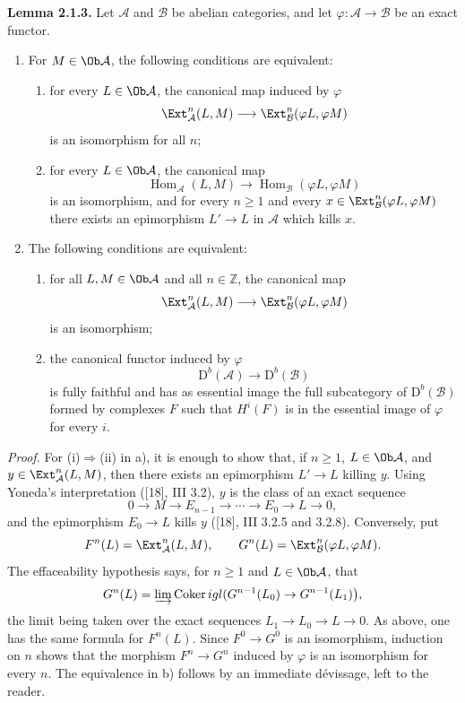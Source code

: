 \textbf{Lemma 2.1.3.} Let $\mathcal A$ and $\mathcal B$ be abelian categories, and let $\varphi:\mathcal A\to\mathcal B$ be an exact functor.
\begin{enumerate}[label=\alph*)]
\item For $M\in\Ob\mathcal A$, the following conditions are equivalent:
\begin{enumerate}[label=(\roman*)]
\item for every $L\in\Ob\mathcal A$, the canonical map induced by $\varphi$
\[
\Ext^n_{\mathcal A}(L,M)\longrightarrow\Ext^n_{\mathcal B}(\varphi L,\varphi M)
\]
is an isomorphism for all $n$;
\item for every $L\in\Ob\mathcal A$, the canonical map
\[
\operatorname{Hom}_{\mathcal A}(L,M)\longrightarrow\operatorname{Hom}_{\mathcal B}(\varphi L,\varphi M)
\]
is an isomorphism, and for every $n\ge1$ and every $x\in\Ext^n_{\mathcal B}(\varphi L,\varphi M)$ there exists an epimorphism $L'\to L$ in $\mathcal A$ which kills $x$.
\end{enumerate}
\item The following conditions are equivalent:
\begin{enumerate}[label=(\roman*)]
\item for all $L,M\in\Ob\mathcal A$ and all $n\in\mathbb Z$, the canonical map
\[
\Ext^n_{\mathcal A}(L,M)\longrightarrow\Ext^n_{\mathcal B}(\varphi L,\varphi M)
\]
is an isomorphism;
\item the canonical functor induced by $\varphi$
\[
\mathrm D^b(\mathcal A)\longrightarrow\mathrm D^b(\mathcal B)
\]
is fully faithful and has as essential image the full subcategory of $\mathrm D^b(\mathcal B)$ formed by complexes $F$ such that $H^i(F)$ is in the essential image of $\varphi$ for every $i$.
\end{enumerate}
\end{enumerate}

\emph{Proof.} For (i)$\Rightarrow$(ii) in a), it is enough to show that, if $n\ge1$, $L\in\Ob\mathcal A$, and $y\in\Ext^n_{\mathcal A}(L,M)$, then there exists an epimorphism $L'\to L$ killing $y$. Using Yoneda's interpretation ([18], III 3.2), $y$ is the class of an exact sequence
\[
0\longrightarrow M\longrightarrow E_{n-1}\longrightarrow\cdots\longrightarrow E_0\longrightarrow L\longrightarrow0,
\]
and the epimorphism $E_0\to L$ kills $y$ ([18], III 3.2.5 and 3.2.8). Conversely, put
\[
F^n(L)=\Ext^n_{\mathcal A}(L,M),\qquad
G^n(L)=\Ext^n_{\mathcal B}(\varphi L,\varphi M).
\]
The effaceability hypothesis says, for $n\ge1$ and $L\in\Ob\mathcal A$, that
\[
G^n(L)=\varinjlim\operatorname{Coker}igl(G^{n-1}(L_0)\to G^{n-1}(L_1)\bigr),
\]
the limit being taken over the exact sequences $L_1\to L_0\to L\to0$. As above, one has the same formula for $F^n(L)$. Since $F^0\to G^0$ is an isomorphism, induction on $n$ shows that the morphism $F^n\to G^n$ induced by $\varphi$ is an isomorphism for every $n$. The equivalence in b) follows by an immediate dévissage, left to the reader.

